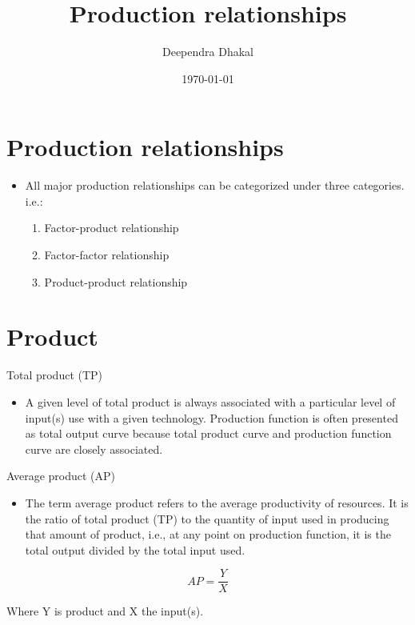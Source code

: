 \documentclass[12pt,ignorenonframetext,aspectratio=169]{beamer}
\title{\insertsectionhead}
  {
    \definecolor{white}{rgb}{0.776,0.357,0.157}
    \definecolor{iqss@orange}{rgb}{1,1,1}
    \ifnum \insertmainframenumber > \insertframenumber
    \frame{
      \frametitle{\iqsssectiontitleheader}
      \tableofcontents[currentsection]
    }
    \else
    \frame{
      \frametitle{Backup Slides}
      \tableofcontents[sectionstyle=shaded/shaded,subsectionstyle=shaded/shaded/shaded]
    }
    \fi
  }
\title[]{Production relationships}
\author[
        Deependra Dhakal
    ]{Deependra Dhakal}
\institute[
    ]{
    GAASC, Baitadi \and Tribhuwan University
    }
\date[
      \today
  ]{
      \today
        }
\providecommand{\tightlist}{%
  \setlength{\itemsep}{0pt}\setlength{\parskip}{0pt}}
\begin{document}
  \begin{frame}[plain]
  \titlepage
  \end{frame}



\hypertarget{production-relationships}{%
\section{Production relationships}\label{production-relationships}}

\begin{frame}{}
\protect\hypertarget{section}{}
\begin{itemize}
\tightlist
\item
  All major production relationships can be categorized under three
  categories. i.e.:

  \begin{enumerate}
  \tightlist
  \item
    Factor-product relationship
  \item
    Factor-factor relationship
  \item
    Product-product relationship
  \end{enumerate}
\end{itemize}
\end{frame}

\hypertarget{product}{%
\section{Product}\label{product}}

\begin{frame}{Total product (TP)}
\protect\hypertarget{total-product-tp}{}
\begin{itemize}
\tightlist
\item
  A given level of total product is always associated with a particular
  level of input(s) use with a given technology. Production function is
  often presented as total output curve because total product curve and
  production function curve are closely associated.
\end{itemize}
\end{frame}

\begin{frame}{Average product (AP)}
\protect\hypertarget{average-product-ap}{}
\begin{itemize}
\tightlist
\item
  The term average product refers to the average productivity of
  resources. It is the ratio of total product (TP) to the quantity of
  input used in producing that amount of product, i.e., at any point on
  production function, it is the total output divided by the total input
  used.
\end{itemize}

\[
AP = \frac{Y}{X}
\]

Where Y is product and X the input(s).
\end{frame}
\end{document}
